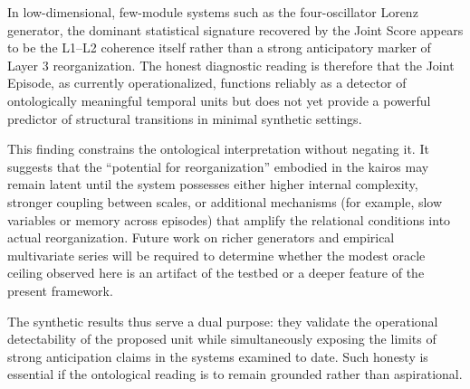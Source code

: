 In low-dimensional, few-module systems such as the four-oscillator Lorenz generator, the dominant statistical signature recovered by the Joint Score appears to be the L1--L2 coherence itself rather than a strong anticipatory marker of Layer 3 reorganization. The honest diagnostic reading is therefore that the Joint Episode, as currently operationalized, functions reliably as a detector of ontologically meaningful temporal units but does not yet provide a powerful predictor of structural transitions in minimal synthetic settings.

This finding constrains the ontological interpretation without negating it. It suggests that the ``potential for reorganization'' embodied in the kairos may remain latent until the system possesses either higher internal complexity, stronger coupling between scales, or additional mechanisms (for example, slow variables or memory across episodes) that amplify the relational conditions into actual reorganization. Future work on richer generators and empirical multivariate series will be required to determine whether the modest oracle ceiling observed here is an artifact of the testbed or a deeper feature of the present framework.

The synthetic results thus serve a dual purpose: they validate the operational detectability of the proposed unit while simultaneously exposing the limits of strong anticipation claims in the systems examined to date. Such honesty is essential if the ontological reading is to remain grounded rather than aspirational.